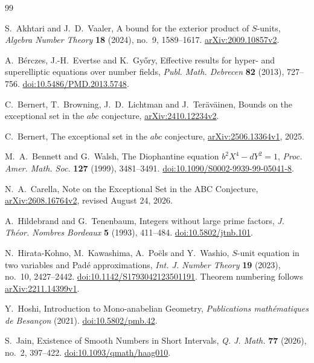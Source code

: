 \documentclass[11pt]{amsart}
\theoremstyle{definition}
\theoremstyle{remark}
\begin{document}
\begin{thebibliography}{99}
\raggedright

S.~Akhtari and J.~D.~Vaaler, A bound for the exterior product of $S$-units,
\emph{Algebra Number Theory} \textbf{18} (2024), no.~9, 1589--1617.
\href{https://arxiv.org/abs/2009.10857v2}{arXiv:2009.10857v2}.

A.~B\'erczes, J.-H.~Evertse and K.~Gy\H{o}ry,
Effective results for hyper- and superelliptic equations over number fields,
\emph{Publ. Math. Debrecen} \textbf{82} (2013), 727--756.
\href{https://doi.org/10.5486/PMD.2013.5748}{doi:10.5486/PMD.2013.5748}.

C.~Bernert, T.~Browning, J.~D.~Lichtman and J.~Ter\"av\"ainen,
Bounds on the exceptional set in the $abc$ conjecture,
\href{https://arxiv.org/abs/2410.12234v2}{arXiv:2410.12234v2}.

C.~Bernert, The exceptional set in the $abc$ conjecture,
\href{https://arxiv.org/abs/2506.13364v1}{arXiv:2506.13364v1}, 2025.

M.~A.~Bennett and G.~Walsh, The Diophantine equation $b^2X^4-dY^2=1$,
\emph{Proc. Amer. Math. Soc.} \textbf{127} (1999), 3481--3491.
\href{https://doi.org/10.1090/S0002-9939-99-05041-8}{doi:10.1090/S0002-9939-99-05041-8}.

N.~A.~Carella, Note on the Exceptional Set in the ABC Conjecture,
\href{https://arxiv.org/abs/2608.16764v2}{arXiv:2608.16764v2},
revised August 24, 2026.

A.~Hildebrand and G.~Tenenbaum, Integers without large prime factors,
\emph{J. Th\'eor. Nombres Bordeaux} \textbf{5} (1993), 411--484.
\href{https://doi.org/10.5802/jtnb.101}{doi:10.5802/jtnb.101}.

N.~Hirata-Kohno, M.~Kawashima, A.~Po\"els and Y.~Washio,
$S$-unit equation in two variables and Pad\'e approximations,
\emph{Int. J. Number Theory} \textbf{19} (2023), no.~10, 2427--2442.
\href{https://doi.org/10.1142/S1793042123501191}{doi:10.1142/S1793042123501191}.
Theorem numbering follows
\href{https://arxiv.org/abs/2211.14399v1}{arXiv:2211.14399v1}.

Y.~Hoshi, Introduction to Mono-anabelian Geometry,
\emph{Publications math\'ematiques de Besan\c con} (2021).
\href{https://doi.org/10.5802/pmb.42}{doi:10.5802/pmb.42}.

S.~Jain, Existence of Smooth Numbers in Short Intervals,
\emph{Q. J. Math.} \textbf{77} (2026), no.~2, 397--422.
\href{https://doi.org/10.1093/qmath/haag010}{doi:10.1093/qmath/haag010}.


\end{thebibliography}
\end{document}
